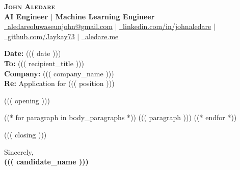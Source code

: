 \documentclass[letterpaper,11pt]{article}
\begin{document}
\begin{center}
    \textbf{\Huge \scshape John Aledare} \\ \vspace{3pt}
    \small \textbf{AI Engineer $|$ Machine Learning Engineer} \\ \vspace{2pt}
    \small \href{mailto:aledareoluwaseunjohn@gmail.com}{\faEnvelope\ aledareoluwaseunjohn@gmail.com} $|$ 
    \href{https://linkedin.com/in/johnaledare}{\faLinkedin\ linkedin.com/in/johnaledare} $|$
    \href{https://github.com/Jaykay73}{\faGithub\ github.com/Jaykay73} $|$
    \href{https://aledare.me}{\faGlobe\ aledare.me}
\end{center}

\vspace{10pt}

\textbf{Date:} ((( date ))) \\
\textbf{To:} ((( recipient_title ))) \\
\textbf{Company:} ((( company_name ))) \\
\textbf{Re:} Application for ((( position )))

\vspace{12pt}

((( opening )))

((* for paragraph in body_paragraphs *))
\vspace{8pt}
((( paragraph )))
((* endfor *))

\vspace{8pt}
((( closing )))

\vspace{14pt}
Sincerely, \\ \vspace{4pt}
\textbf{((( candidate_name )))}
\end{document}
